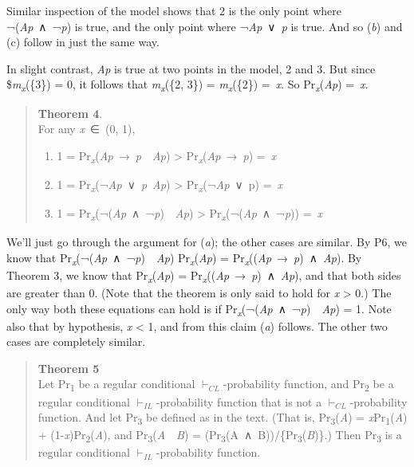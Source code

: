 \documentclass[
  10pt,
  letterpaper,
  DIV=11,
  numbers=noendperiod,
  twoside]{scrartcl}
\providecommand{\tightlist}{%
  \setlength{\itemsep}{0pt}\setlength{\parskip}{0pt}}\usepackage{longtable,booktabs,array}
\begin{document}
Similar inspection of the model shows that 2 is the only point where
¬(\emph{Ap}~∧~¬\emph{p}) is true, and the only point where
¬\emph{Ap}~∨~\emph{p} is true. And so (\emph{b}) and (c) follow in just
the same way.

In slight contrast, \emph{Ap} is true at two points in the model, 2 and
3. But since \$\emph{m\textsubscript{x}}(\{3\}) = 0, it follows that
\emph{m\textsubscript{x}}(\{2, 3\}) = \emph{m\textsubscript{x}}(\{2\})
=~\emph{x}. So Pr\textsubscript{\emph{x}}(\emph{Ap}) =~\emph{x}.

\begin{quote}
\textbf{Theorem 4}.\\
For any \emph{x}~∈~(0, 1),

\begin{enumerate}
\def\labelenumi{\alph{enumi}.}
\tightlist
\item
  1 =
  Pr\textsubscript{\emph{x}}(\emph{Ap}~→~\emph{p}~\textbar~\emph{Ap})
  \textgreater{} Pr\textsubscript{\emph{x}}(\emph{Ap}~→~\emph{p})
  =~\emph{x}
\item
  1 =
  Pr\textsubscript{\emph{x}}(¬\emph{Ap}~∨~\emph{p}\textbar~\emph{Ap})
  \textgreater{} Pr\textsubscript{\emph{x}}(¬\emph{Ap}~∨~p) =~\emph{x}
\item
  1 =
  Pr\textsubscript{\emph{x}}(¬(\emph{Ap}~∧~¬\emph{p})~\textbar~\emph{Ap})
  \textgreater{} Pr\textsubscript{\emph{x}}(¬(\emph{Ap}~∧~¬\emph{p}))
  =~\emph{x}
\end{enumerate}
\end{quote}

We'll just go through the argument for (\emph{a}); the other cases are
similar. By P6, we know that
Pr\textsubscript{\emph{x}}(¬(\emph{Ap}~∧~¬\emph{p})~\textbar~\emph{Ap})
Pr\textsubscript{\emph{x}}(\emph{Ap}) =
Pr\textsubscript{\emph{x}}((\emph{Ap}~→~\emph{p})~∧~\emph{Ap}). By
Theorem 3, we know that Pr\textsubscript{\emph{x}}(\emph{Ap}) =
Pr\textsubscript{\emph{x}}((\emph{Ap}~→~\emph{p})~∧~\emph{Ap}), and that
both sides are greater than 0. (Note that the theorem is only said to
hold for \emph{x} \textgreater{} 0.) The only way both these equations
can hold is if
Pr\textsubscript{\emph{x}}(¬(\emph{Ap}~∧~¬\emph{p})~\textbar~\emph{Ap})
= 1. Note also that by hypothesis, \emph{x} \textless{} 1, and from this
claim (\emph{a}) follows. The other two cases are completely similar.

\begin{quote}
\textbf{Theorem 5}\\
Let Pr\textsubscript{1} be a regular conditional
\(\vdash_{CL}\)-probability function, and Pr\textsubscript{2} be a
regular conditional \(\vdash_{IL}\)-probability function that is not a
\(\vdash_{CL}\)-probability function. And let Pr\textsubscript{3} be
defined as in the text. (That is, Pr\textsubscript{3}(\emph{A}) =
\emph{x}Pr\textsubscript{1}(\emph{A}) +
(1-\emph{x})Pr\textsubscript{2}(\emph{A}), and
Pr\textsubscript{3}(\emph{A}~\textbar~\emph{B}) =
(Pr\textsubscript{3}(A~∧~B))/\{Pr\textsubscript{3}(\emph{B})\}.) Then
Pr\textsubscript{3} is a regular conditional \(\vdash_{IL}\)-probability
function.
\end{quote}
\end{document}
